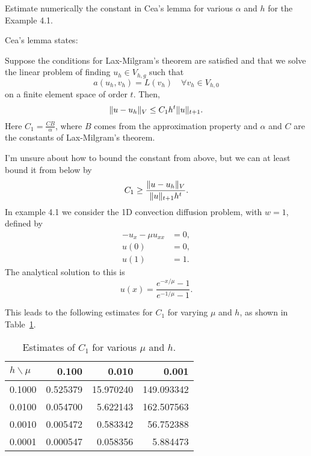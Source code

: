 \begin{exercise}
    Estimate numerically the constant in Cea’s lemma for various $\alpha$ and $h$ for the Example 4.1.
\end{exercise}

\begin{solution}
    Cea's lemma states:
    \begin{theorem}
        Suppose the conditions for Lax-Milgram's theorem are satisfied and that we solve the linear problem of finding $u_h \in V_{h, g}$ such that
        \begin{equation*}
            a(u_h, v_h) = L(v_h) \quad \forall v_h \in V_{h, 0}
        \end{equation*}
        on a finite element space of order $t$.
        Then,
        \begin{equation*}
            \lVert u - u_h\rVert_V
            \leq
            C_1 h^t \lVert u\rVert_{t+1}.
        \end{equation*}
        Here $C_1 = \frac{CB}{\alpha}$, where $B$ comes from the approximation property and $\alpha$ and $C$ are the constants of Lax-Milgram's theorem.
    \end{theorem}

    I'm unsure about how to bound the constant from above, but we can at least bound it from below by
    \begin{equation*}
        C_1 \geq \frac{\lVert u - u_h\rVert_V}{\lVert u\rVert_{t+1} h^t}.
    \end{equation*}
    In example 4.1 we consider the 1D convection diffusion problem, with $w = 1$, defined by
    \begin{align*}
        -u_x - \mu u_{xx} &= 0, \\
        u(0) &= 0, \\
        u(1) &= 1.
    \end{align*}
    The analytical solution to this is
    \begin{equation*}
        u(x) = \frac{e^{-x / \mu} - 1}{e^{-1 / \mu} - 1}.
    \end{equation*}

    This leads to the following estimates for $C_1$ for varying $\mu$ and $h$, as shown in Table~\ref{tab:cea}.

    \begin{table}[h]
        \centering
        \caption{Estimates of $C_1$ for various $\mu$ and $h$.\label{tab:cea}}
        \begin{tabular}{lrrr}
            \toprule
            $h \backslash \mu$ & 0.100 & 0.010 & 0.001 \\
            \midrule
            0.1000 & 0.525379 & 15.970240 & 149.093342 \\
            0.0100 & 0.054700 & 5.622143 & 162.507563 \\
            0.0010 & 0.005472 & 0.583342 & 56.752388 \\
            0.0001 & 0.000547 & 0.058356 & 5.884473 \\
            \bottomrule
        \end{tabular}
    \end{table}
\end{solution}